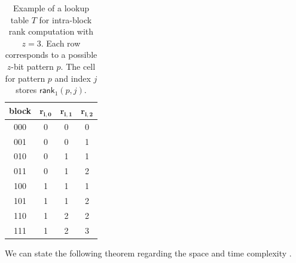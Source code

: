 \begin{table}[h]
    \centering
    \begin{tabular}{|c|c|c|c|}
        \hline
        block & $\mathbf{r_{i,0}}$ & $\mathbf{r_{i,1}}$ & $\mathbf{r_{i,2}}$ \\
        \hline
        000   & 0                  & 0                  & 0                  \\
        001   & 0                  & 0                  & 1                  \\
        010   & 0                  & 1                  & 1                  \\
        011   & 0                  & 1                  & 2                  \\
        100   & 1                  & 1                  & 1                  \\
        101   & 1                  & 1                  & 2                  \\
        110   & 1                  & 2                  & 2                  \\
        111   & 1                  & 2                  & 3                  \\
        \hline
    \end{tabular}
    \caption{Example of a lookup table $T$ for intra-block rank computation with $z = 3$. Each row corresponds to a possible $z$-bit pattern $p$. The cell for pattern $p$ and index $j$ stores $\textsf{rank}_1(p, j)$.} \label{tab:lookup}
\end{table}

We can state the following theorem regarding the space and time complexity \cite{Jacobson}.


